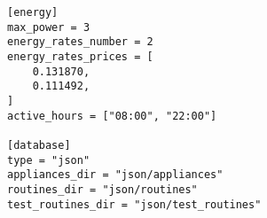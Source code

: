 \begin{lstlisting}[language=numbered,caption={Example of the configuration file used during development},label=code:config,float,floatplacement=H]
[energy]
max_power = 3
energy_rates_number = 2
energy_rates_prices = [
    0.131870,
    0.111492,
]
active_hours = ["08:00", "22:00"]

[database]
type = "json"
appliances_dir = "json/appliances"
routines_dir = "json/routines"
test_routines_dir = "json/test_routines"
\end{lstlisting}